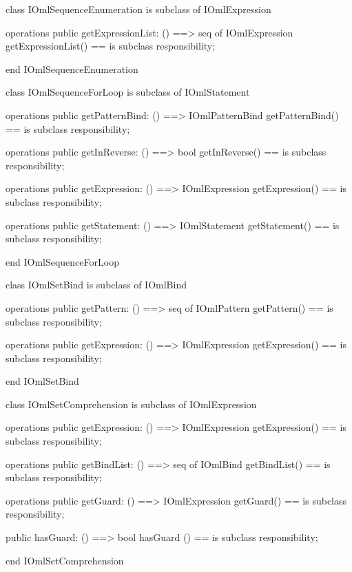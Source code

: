 \begin{vdm_al}
class IOmlSequenceEnumeration
 is subclass of IOmlExpression

operations
  public getExpressionList: () ==> seq of IOmlExpression
  getExpressionList() == is subclass responsibility;

end IOmlSequenceEnumeration
\end{vdm_al}

\begin{vdm_al}
class IOmlSequenceForLoop
 is subclass of IOmlStatement

operations
  public getPatternBind: () ==> IOmlPatternBind
  getPatternBind() == is subclass responsibility;

operations
  public getInReverse: () ==> bool
  getInReverse() == is subclass responsibility;

operations
  public getExpression: () ==> IOmlExpression
  getExpression() == is subclass responsibility;

operations
  public getStatement: () ==> IOmlStatement
  getStatement() == is subclass responsibility;

end IOmlSequenceForLoop
\end{vdm_al}

\begin{vdm_al}
class IOmlSetBind
 is subclass of IOmlBind

operations
  public getPattern: () ==> seq of IOmlPattern
  getPattern() == is subclass responsibility;

operations
  public getExpression: () ==> IOmlExpression
  getExpression() == is subclass responsibility;

end IOmlSetBind
\end{vdm_al}

\begin{vdm_al}
class IOmlSetComprehension
 is subclass of IOmlExpression

operations
  public getExpression: () ==> IOmlExpression
  getExpression() == is subclass responsibility;

operations
  public getBindList: () ==> seq of IOmlBind
  getBindList() == is subclass responsibility;

operations
  public getGuard: () ==> IOmlExpression
  getGuard() == is subclass responsibility;

  public hasGuard: () ==> bool
  hasGuard () == is subclass responsibility;

end IOmlSetComprehension
\end{vdm_al}

